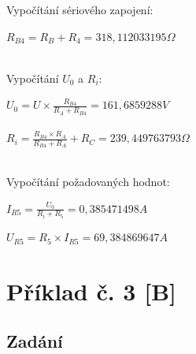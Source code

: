 \documentclass[12pt,a4paper,titlepage,final]{article}
\begin{document}
	Vypočítání sériového zapojení: \\
	
	\begin{tabbing}
		$ { \displaystyle R_{B4} = R_{B} + R_{4} = 318,112033195 \Omega}$ \\
		\\
	\end{tabbing}
	
	Vypočítání $U_{0}$ a $R_{i}$: \\
	
	\begin{tabbing}
		$ { \displaystyle U_{0} = U \times \frac{R_{B4}}{R_{A}+R_{B4}} = 
		161,6859288 V}$\\
		\\
		$ { \displaystyle R_{i} = 
		\frac{R_{B4} \times R_{A}}{R_{B4}+R_{A}} + R_{C} = 
		239,449763793 \Omega}$ \\
		\\
	\end{tabbing}
	
	Vypočítání požadovaných hodnot:
	
	\begin{tabbing}
		$ { \displaystyle I_{R5} = \frac{U_{0}}{R_{i} + R_{5}} = 
		0,385471498 A}$ \\
	\end{tabbing}
	
	\begin{tabbing}
		$ { \displaystyle U_{R5} = R_{5} \times I_{R5} = 
		69,384869647 A}$ \\
	\end{tabbing}

	\newpage


	\section*{Příklad č. 3 [B]} \label{pr3}


	\subsection*{Zadání}
\end{document}
